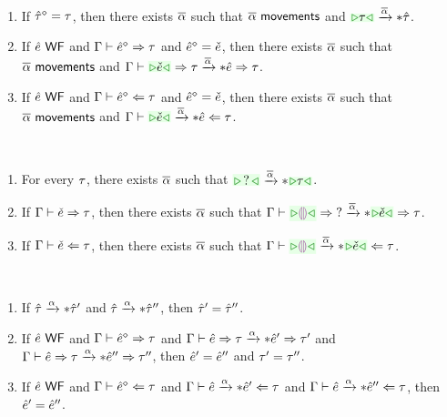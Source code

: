 \documentclass{article}
\begin{document}
\begin{lemma}[name=Reach Down] \
  \begin{enumerate}
    \item If $\hat{\tau}^{\diamond} = \tau$, then there exists $\overline{\alpha}$ such that $\overline{\alpha} ~{\normalfont\textsf{movements}}$
      and $\AUTActionIter{\ZTCursor{\TMV}}{\ZTMV}{\AIMV}$.

    \item If $\hat{e} ~{\normalfont\textsf{WF}}$ and $\Gamma \vdash \hat{e}^{\diamond} \Rightarrow \tau$ and
      $\hat{e}^{\diamond} = \check{e}$, then there exists $\overline{\alpha}$ such that $\overline{\alpha} ~{\normalfont\textsf{movements}}$ and
      $\ASEActionIter{\ctx}{\ZTCursor{\ECMV}}{\TMV}{\ZMV}{\TMV}{\AIMV}$.

    \item If $\hat{e} ~{\normalfont\textsf{WF}}$ and $\Gamma \vdash \hat{e}^{\diamond} \Leftarrow \tau$ and
      $\hat{e}^{\diamond} = \check{e}$, then there exists $\overline{\alpha}$ such that $\overline{\alpha} ~{\normalfont\textsf{movements}}$ and
      $\AAEActionIter{\ctx}{\ZTCursor{\ECMV}}{\ZMV}{\TMV}{\AIMV}$.
  \end{enumerate}
\end{lemma}

\begin{theorem}[name=Constructability] \
  \begin{enumerate}
    \item For every $\tau$, there exists $\overline{\alpha}$ such that
      $\AUTActionIter{\ZTCursor{\TUnknown}}{\ZTCursor{\TMV}}{\AIMV}$.

    \item If $\Gamma \vdash \check{e} \Rightarrow \tau$, then there exists $\overline{\alpha}$ such that
      $\ASEActionIter{\ctx}{\ZCursor{\EEHole}}{\TUnknown}{\ZCursor{\ECMV}}{\TMV}{\AIMV}$.

    \item If $\Gamma \vdash \check{e} \Leftarrow \tau$, then there exists $\overline{\alpha}$ such that
      $\AAEActionIter{\ctx}{\ZCursor{\EEHole}}{\ZCursor{\ECMV}}{\TMV}{\AIMV}$.
  \end{enumerate}
\end{theorem}

\begin{theorem}[name=Determinism] \
  \begin{enumerate}
    \item If $\hat{\tau} \xrightarrow{\alpha}* \hat{\tau}'$ and $\hat{\tau} \xrightarrow{\alpha}* \hat{\tau}''$, then
      $\hat{\tau}' = \hat{\tau}''$.

    \item If $\hat{e} ~{\normalfont\textsf{WF}}$ and $\Gamma \vdash \hat{e}^{\diamond} \Rightarrow \tau$ and
      $\Gamma \vdash \hat{e} \Rightarrow \tau \xrightarrow{\alpha}* \hat{e}' \Rightarrow \tau'$ and
      $\Gamma \vdash \hat{e} \Rightarrow \tau \xrightarrow{\alpha}* \hat{e}'' \Rightarrow \tau''$, then $\hat{e}' = \hat{e}''$ and
      $\tau' = \tau''$.

    \item If $\hat{e} ~{\normalfont\textsf{WF}}$ and $\Gamma \vdash \hat{e}^{\diamond} \Leftarrow \tau$ and
      $\Gamma \vdash \hat{e} \xrightarrow{\alpha}* \hat{e}' \Leftarrow \tau$ and
      $\Gamma \vdash \hat{e} \xrightarrow{\alpha}* \hat{e}'' \Leftarrow \tau$, then $\hat{e}' = \hat{e}''$.
  \end{enumerate}
\end{theorem}
\end{document}
